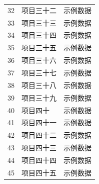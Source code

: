 \begin{longtable}{cll}
  32 & 项目三十二 & 示例数据 \\
  33 & 项目三十三 & 示例数据 \\
  34 & 项目三十四 & 示例数据 \\
  35 & 项目三十五 & 示例数据 \\
  36 & 项目三十六 & 示例数据 \\
  37 & 项目三十七 & 示例数据 \\
  38 & 项目三十八 & 示例数据 \\
  39 & 项目三十九 & 示例数据 \\
  40 & 项目四十 & 示例数据 \\
  41 & 项目四十一 & 示例数据 \\
  42 & 项目四十二 & 示例数据 \\
  43 & 项目四十三 & 示例数据 \\
  44 & 项目四十四 & 示例数据 \\
  45 & 项目四十五 & 示例数据 \\
\end{longtable}
